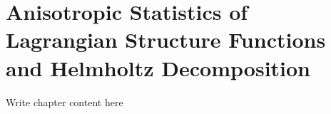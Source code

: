\chapter{Anisotropic Statistics of Lagrangian Structure Functions and Helmholtz Decomposition}
Write chapter content here
